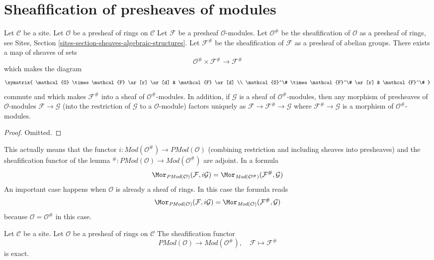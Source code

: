 \section{Sheafification of presheaves of modules}
\label{section-sheafification-presheaves-modules}

\begin{lemma}
\label{lemma-sheafification-presheaf-modules}
Let $\mathcal{C}$ be a site.
Let $\mathcal{O}$ be a presheaf of rings on $\mathcal{C}$
Let $\mathcal{F}$ be a presheaf $\mathcal{O}$-modules.
Let $\mathcal{O}^\#$ be the sheafification of $\mathcal{O}$ as a presheaf
of rings, see Sites, Section \ref{sites-section-sheaves-algebraic-structures}.
Let $\mathcal{F}^\#$ be the sheafification of $\mathcal{F}$
as a presheaf of abelian groups. There exists a map of
sheaves of sets
$$
\mathcal{O}^\# \times \mathcal{F}^\#
\longrightarrow
\mathcal{F}^\#
$$
which makes the diagram
$$
\xymatrix{
\mathcal{O} \times \mathcal{F} \ar[r] \ar[d] &
\mathcal{F} \ar[d] \\
\mathcal{O}^\# \times \mathcal{F}^\# \ar[r] &
\mathcal{F}^\#
}
$$
commute and which makes $\mathcal{F}^\#$ into a sheaf
of $\mathcal{O}^\#$-modules. In addition, if $\mathcal{G}$
is a sheaf of $\mathcal{O}^\#$-modules, then any morphism
of presheaves of $\mathcal{O}$-modules $\mathcal{F} \to \mathcal{G}$
(into the restriction of $\mathcal{G}$ to a $\mathcal{O}$-module)
factors uniquely as $\mathcal{F} \to \mathcal{F}^\# \to \mathcal{G}$
where $\mathcal{F}^\# \to \mathcal{G}$ is a morphism of
$\mathcal{O}^\#$-modules.
\end{lemma}

\begin{proof}
Omitted.
\end{proof}

\noindent
This actually means that the functor
$i : \textit{Mod}(\mathcal{O}^\#) \to \textit{PMod}(\mathcal{O})$
(combining restriction and including sheaves into presheaves)
and the sheafification functor of the lemma
${}^\# : \textit{PMod}(\mathcal{O}) \to \textit{Mod}(\mathcal{O}^\#)$
are adjoint. In a formula
$$
\Mor_{\textit{PMod}(\mathcal{O})}(\mathcal{F}, i\mathcal{G})
=
\Mor_{\textit{Mod}(\mathcal{O}^\#)}(\mathcal{F}^\#, \mathcal{G})
$$
An important case happens when $\mathcal{O}$ is already a sheaf of
rings. In this case the formula reads
$$
\Mor_{\textit{PMod}(\mathcal{O})}(\mathcal{F}, i\mathcal{G})
=
\Mor_{\textit{Mod}(\mathcal{O})}(\mathcal{F}^\#, \mathcal{G})
$$
because $\mathcal{O} = \mathcal{O}^\#$ in this case.

\begin{lemma}
\label{lemma-sheafification-exact}
Let $\mathcal{C}$ be a site.
Let $\mathcal{O}$ be a presheaf of rings on $\mathcal{C}$
The sheafification functor
$$
\textit{PMod}(\mathcal{O}) \longrightarrow \textit{Mod}(\mathcal{O}^\#), \quad
\mathcal{F} \longmapsto \mathcal{F}^\#
$$
is exact.
\end{lemma}

